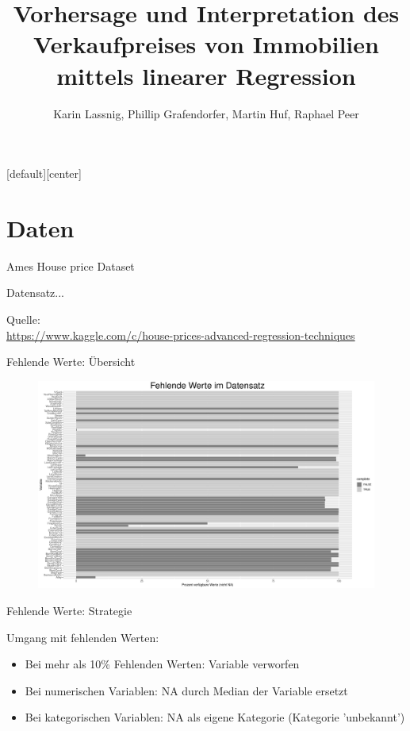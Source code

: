 \documentclass[10pt]{beamer}
\title{Vorhersage und Interpretation des\\Verkaufpreises von Immobilien\\mittels linearer Regression}
\date{}
\author{Karin Lassnig, Phillip Grafendorfer, Martin Huf, Raphael Peer}
\begin{document}
[default][center]

\maketitle

\section{Daten}


\begin{frame}{Ames House price Dataset}
	
	Datensatz...
	
	\begin{tiny}		
		Quelle:\\
		\url{https://www.kaggle.com/c/house-prices-advanced-regression-techniques}
	\end{tiny}
\end{frame}


\begin{frame}{Fehlende Werte: Übersicht}
	
	\begin{figure}
		\includegraphics[width=\textwidth, keepaspectratio]{figures/na_stats}
	\end{figure}
	
\end{frame}

\begin{frame}{Fehlende Werte: Strategie}
	
	\begin{Large}{Umgang mit fehlenden Werten:}\end{Large}
	\begin{itemize}
		\item Bei mehr als 10\% Fehlenden Werten: Variable verworfen
		\item Bei numerischen Variablen: NA durch Median der Variable ersetzt
		\item Bei kategorischen Variablen: NA als eigene Kategorie (Kategorie 'unbekannt')
	\end{itemize}
	
\end{frame}
\end{document}
